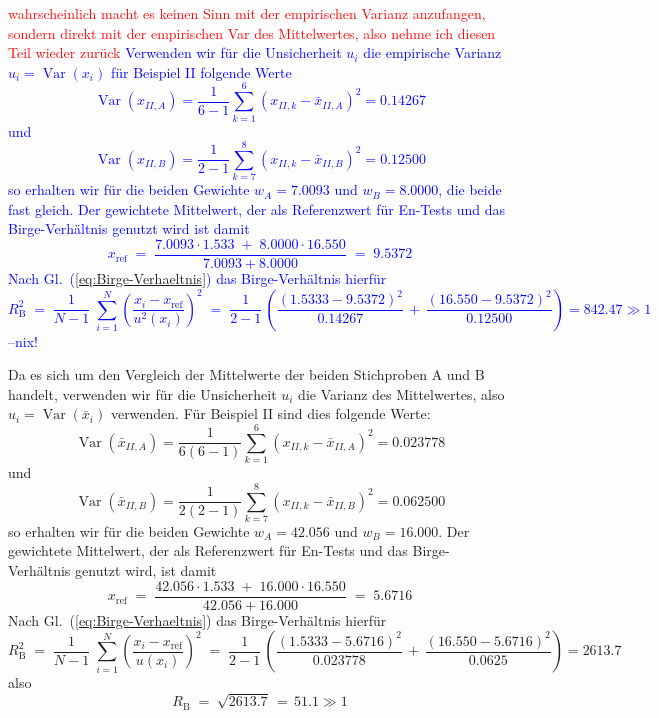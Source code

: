 \textcolor{red}{wahrscheinlich macht es keinen Sinn mit der empirischen Varianz
anzufangen, sondern direkt mit der empirischen Var des Mittelwertes, also nehme ich
diesen Teil wieder zurück}
\textcolor{blue}{Verwenden wir für die Unsicherheit $u_i$ die empirische Varianz
$u_i = \operatorname{Var}(x_i)$ für Beispiel II folgende Werte
$$
\operatorname{Var}(x_{II,A}) = 
\frac{1}{6-1} \sum\limits_{k=1}^{6} \left(x_{II,k} - \bar x_{II,A} \right)^2 = 0.14267
$$
und
$$
\operatorname{Var}(x_{II,B}) = \frac{1}{2-1} \sum\limits_{k=7}^{8} \left(x_{II,k} - \bar x_{II,B} \right)^2
= 0.12500
$$ 
so erhalten wir für die beiden Gewichte $w_A = 7.0093$ und $w_B = 8.0000$, die beide fast gleich.
Der gewichtete Mittelwert, der als Referenzwert für En-Tests und das Birge-Verhältnis genutzt wird ist damit
$$
x_\mathrm{ref} \; = \; \frac{7.0093 \cdot 1.533 \; + \; 8.0000 \cdot 16.550}{7.0093 + 8.0000}
\; = \; 9.5372
$$
Nach Gl.~(\ref{eq:Birge-Verhaeltnis}) das Birge-Verhältnis hierfür
$$
R^2_\mathrm{B} \; = \; \frac{1}{N-1} \; \sum_{i=1}^N \left( \frac{x_i-x_\mathrm{ref}}{u^2(x_i)} \right)^2 \; = \;
 \frac{1}{2-1} \, \left( \frac{\left(1.5333 - 9.5372\right)^2}{0.14267}
 \, + \, \frac{ \left( 16.550 - 9.5372 \right)^2}{0.12500} \right) = 842.47 \gg 1
$$
--nix!}

Da es sich um den Vergleich der Mittelwerte der beiden Stichproben A und B handelt, verwenden wir
für die Unsicherheit $u_i$ die Varianz des Mittelwertes, also
$u_i = \operatorname{Var}(\bar x_i)$ verwenden. Für Beispiel II sind dies folgende Werte:
$$
\operatorname{Var}(\bar x_{II,A}) = \frac{1}{6(6-1)} \sum\limits_{k=1}^{6} \left(x_{II,k} - \bar x_{II,A} \right)^2 = 0.023778
$$
und
$$
\operatorname{Var}(\bar x_{II,B}) = \frac{1}{2(2-1)} \sum\limits_{k=7}^{8} \left(x_{II,k} - \bar x_{II,B} \right)^2 = 0.062500
\label{eq:VarianzenMWII}
$$
so erhalten wir für die beiden Gewichte $w_A = 42.056$ und $w_B = 16.000$.
Der gewichtete Mittelwert, der als Referenzwert für En-Tests und das Birge-Verhältnis genutzt wird, ist damit
$$
x_\mathrm{ref} \; = \; \frac{42.056 \cdot 1.533 \; + \; 16.000 \cdot 16.550}{42.056 + 16.000}
\; = \; 5.6716
$$
Nach Gl.~(\ref{eq:Birge-Verhaeltnis}) das Birge-Verhältnis hierfür
$$
R^2_\mathrm{B} \; = \; \frac{1}{N-1} \; \sum_{i=1}^N \left( \frac{x_i-x_\mathrm{ref}}{u(x_i)} \right)^2 \; = \;
 \frac{1}{2-1} \, \left( \frac{\left(1.5333 - 5.6716\right)^2}{0.023778}
 \, + \, \frac{ \left( 16.550 - 5.6716 \right)^2}{0.0625} \right) = 2613.7
$$
also
$$
R_\mathrm{B} \; = \; \sqrt{2613.7} \, = \, 51.1  \gg 1
$$


